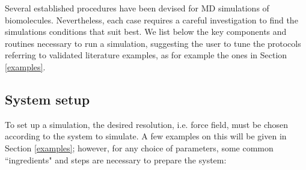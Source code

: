 \documentclass[graybox]{svmult}
\begin{document}
Several established procedures have been devised for MD simulations of biomolecules. Nevertheless, each case requires a careful investigation to find the simulations conditions that suit best. We list below the key components and routines necessary to run a simulation, suggesting the user to tune the protocols referring to validated literature examples, as for example the ones in Section \ref{examples}.

\subsection{System setup}
To set up a simulation, the desired resolution, i.e. force field, must be chosen according to the system to simulate. A few examples on this will be given in Section \ref{examples}; however, for any choice of parameters, some common ``ingredients" and steps are necessary to prepare the system:
\end{document}
